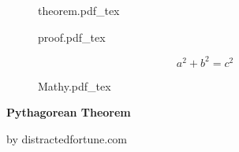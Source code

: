 \documentclass[17pt]{article}
\newcommand{\incfig}[1]{%
    \def\svgwidth{\columnwidth}
    {#1.pdf_tex}
}
\begin{document}

\begin{figure}[ht]
    \centering
    \incfig{theorem}
    \label{fig:pythagorean-theorem}
\end{figure}

\newpage

\begin{figure}[ht]
    \centering
    \incfig{proof}
    \label{fig:pythagorean-theorem-proof}
\end{figure}

\newpage

\[
a^2 + b^2 = c^2
\]


\begin{figure}[ht]
    \centering
    \incfig{Mathy}
    \label{fig:pythagorean-theorem-proof}
\end{figure}

\newpage

\Large
\begin{center}
  \textbf{Pythagorean Theorem}

  by distractedfortune.com
\end{center}
\end{document}
